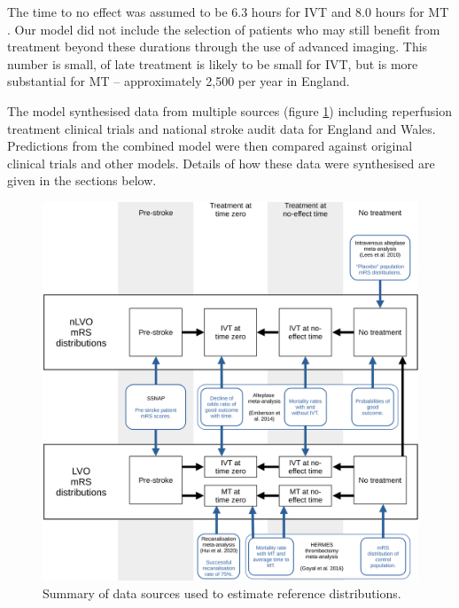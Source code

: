 The time to no effect was assumed to be 6.3 hours for IVT \cite{emberson_effect_2014} and 8.0 hours for MT \cite{fransen_time_2016}. Our model did not include the selection of patients who may still benefit from treatment beyond these durations through the use of advanced imaging. This number is small, of late treatment is likely to be small for IVT, but is more substantial for MT – approximately 2,500 per year in England. 

The model synthesised data from multiple sources (figure \ref{fig:data_sources_grid}) including reperfusion treatment clinical trials and national stroke audit data for England and Wales. Predictions from the combined model were then compared against original clinical trials and other models. Details of how these data were synthesised are given in the sections below.

\begin{figure}[h!]
    \centering
    \includegraphics[width=1.0\linewidth]{images_modelling/data_sources.png}
    \caption{Summary of data sources used to estimate reference distributions.}
    \label{fig:data_sources_grid}
\end{figure}


